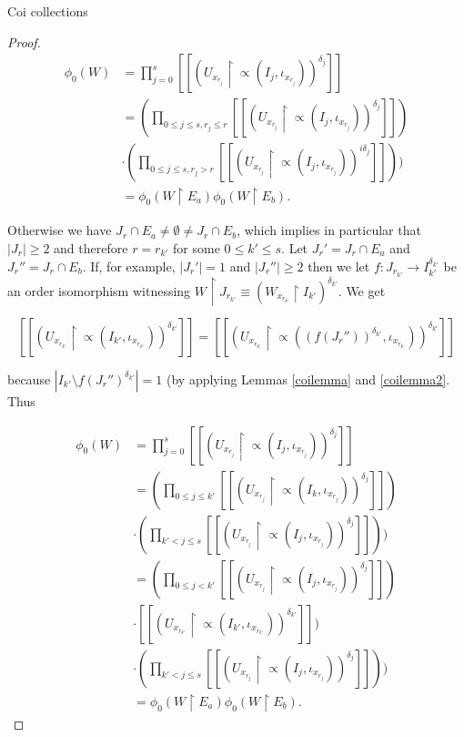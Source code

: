 \documentclass{amsart}
\theoremstyle{definition}\newtheorem{theorem}{Theorem}
\theoremstyle{definition}\newtheorem*{A}{Main Theorem}
\theoremstyle{definition}\newtheorem*{B}{Theorem \ref{elementaryequiv}}
\theoremstyle{definition}\newtheorem*{C}{Theorem \ref{continuous}}
\theoremstyle{definition}\newtheorem*{D}{Theorem \ref{bigisomorphism2}}
\theoremstyle{definition}\newtheorem{bigtheorem}{Main Theorem}
\numberwithin{theorem}{section}
\theoremstyle{definition}\newtheorem{corollary}[theorem]{Corollary}
\theoremstyle{definition}\newtheorem{proposition}[theorem]{Proposition}
\theoremstyle{definition}\newtheorem{definition}[theorem]{Definition}
\theoremstyle{definition}\newtheorem{question}[theorem]{Question}
\theoremstyle{definition}\newtheorem{example}[theorem]{Example}
\theoremstyle{definition}\newtheorem{remark}[theorem]{Remark}
\theoremstyle{definition}\newtheorem{note}[theorem]{Note}
\theoremstyle{definition}\newtheorem{lemma}[theorem]{Lemma}
\theoremstyle{definition}\newtheorem{fact}[theorem]{Fact}
\theoremstyle{definition}\newtheorem{define}[theorem]{Definition}
\theoremstyle{definition}\newtheorem{claim}[theorem]{Claim}
\theoremstyle{definition}\newtheorem{obs}[theorem]{Observation}
\theoremstyle{definition}\newtheorem{definitions}[theorem]{Definitions}
\begin{document}
\begin{section}{Coi collections}
\begin{proof}
$$
\begin{array}{ll}
\phi_0(W) & = \prod_{j = 0}^s[[(U_{x_{r_j}}\upharpoonright \varpropto(I_j, \iota_{x_{r_j}}))^{\delta_j}]]\\
& = (\prod_{0\leq j \leq s, r_j \leq r}[[(U_{x_{r_j}}\upharpoonright \varpropto(I_j, \iota_{x_{r_j}}))^{\delta_j}]])\\
& \cdot (\prod_{0\leq j \leq s, r_j > r}[[(U_{x_{r_j}}\upharpoonright \varpropto(I_j, \iota_{x_{r_j}}))^{i\delta_j}]]))\\
& = \phi_0(W \upharpoonright E_a)\phi_0(W \upharpoonright E_b).
\end{array}
$$

\noindent Otherwise we have $J_r \cap E_a \neq \emptyset \neq J_r \cap E_b$, which implies in particular that $|J_r| \geq 2$ and therefore $r = r_{k'}$ for some $0 \leq k' \leq s$.  Let $J_r' = J_r \cap E_a$ and $J_r'' = J_r \cap E_b$.  If, for example, $|J_r'| = 1$ and $|J_r''| \geq 2$ then we let $f: J_{r_{k'}} \rightarrow I_{k'}^{\delta_{k'}}$ be an order isomorphism witnessing $W \upharpoonright J_{r_{k'}} \equiv (W_{x_{r_{k'}}} \upharpoonright I_{k'})^{\delta_{k'}}$.  We get 

$$[[(U_{x_{r_{k'}}}\upharpoonright \varpropto(I_{k'}, \iota_{x_{r_{k'}}}))^{\delta_{k'}}]] = [[(U_{x_{r_{k'}}}\upharpoonright \varpropto((f(J_r''))^{\delta_{k'}}, \iota_{x_{r_{k'}}}))^{\delta_{k'}}]]$$ 

\noindent because $|I_{k'} \setminus f(J_r'')^{\delta_{k'}}| = 1$ (by applying Lemmas \ref{coilemma} and \ref{coilemma2}.  Thus

$$
\begin{array}{ll}
\phi_0(W) & = \prod_{j = 0}^s[[(U_{x_{r_j}}\upharpoonright \varpropto(I_j, \iota_{x_{r_j}}))^{\delta_j}]]\\
& = (\prod_{0\leq j \leq k'}[[(U_{x_{r_j}}\upharpoonright \varpropto(I_k, \iota_{x_{r_j}}))^{\delta_j}]])\\
& \cdot (\prod_{k' < j \leq s}[[(U_{x_{r_j}}\upharpoonright \varpropto(I_j, \iota_{x_{r_j}}))^{\delta_j}]]))\\
& = (\prod_{0\leq j <  k'}[[(U_{x_{r_j}}\upharpoonright \varpropto(I_j, \iota_{x_{r_j}}))^{\delta_j}]])\\
& \cdot [[(U_{x_{r_{k'}}}\upharpoonright \varpropto(I_{k'}, \iota_{x_{r_{k'}}}))^{\delta_{k'}}]])\\
& \cdot (\prod_{k' < j \leq s}[[(U_{x_{r_j}}\upharpoonright \varpropto(I_j, \iota_{x_{r_j}}))^{\delta_j}]]))\\
& = \phi_0(W \upharpoonright E_a)\phi_0(W \upharpoonright E_b).
\end{array}
$$


\end{proof}
\end{section}
\end{document}
